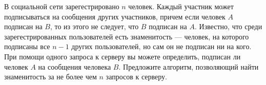\documentclass{article}
\begin{document}
В социальной сети зарегестрировано $n$ человек. Каждый участник может подписываться на сообщения других участников, 
причем если человек $A$ подписан на $B$, то из этого не следует, что $B$ подписан на $A$. Известно, что среди зарегестрированных пользователей есть знаменитость --- человек, на которого подписаны 
все $n-1$ других пользователей, но сам он не подписан ни на кого. При помощи одного запроса к серверу вы можете определить, подписан ли человек $A$ на сообщения человека $B$. Предложите алгоритм, 
позволяющий найти знаменитость за не более чем $n$ запросов к серверу.
\end{document}
